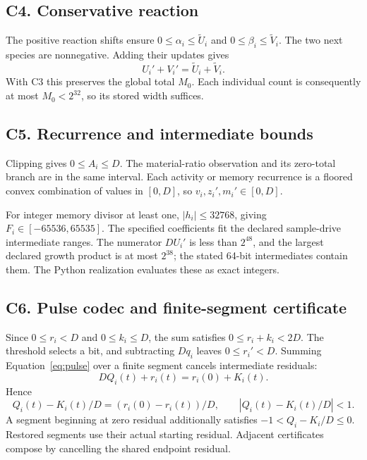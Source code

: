 \documentclass[11pt,a4paper]{article}
\numberwithin{equation}{section}
\begin{document}
\subsection*{C4. Conservative reaction}
The positive reaction shifts ensure $0\le\alpha_i\le\widetilde U_i$ and $0\le\beta_i\le\widetilde V_i$. The two next species are nonnegative. Adding their updates gives
\begin{equation}
U_i'+V_i'=\widetilde U_i+\widetilde V_i.
\end{equation}
With C3 this preserves the global total $M_0$. Each individual count is consequently at most $M_0<2^{32}$, so its stored width suffices.

\subsection*{C5. Recurrence and intermediate bounds}
Clipping gives $0\le A_i\le D$. The material-ratio observation and its zero-total branch are in the same interval. Each activity or memory recurrence is a floored convex combination of values in $[0,D]$, so $v_i,z_i',m_i'\in[0,D]$.

For integer memory divisor at least one, $|h_i|\le32768$, giving $F_i\in[-65536,65535]$. The specified coefficients fit the declared sample-drive intermediate ranges. The numerator $DU_i'$ is less than $2^{48}$, and the largest declared growth product is at most $2^{38}$; the stated 64-bit intermediates contain them. The Python realization evaluates these as exact integers.

\subsection*{C6. Pulse codec and finite-segment certificate}
Since $0\le r_i<D$ and $0\le k_i\le D$, the sum satisfies $0\le r_i+k_i<2D$. The threshold selects a bit, and subtracting $Dq_i$ leaves $0\le r_i'<D$. Summing Equation~\eqref{eq:pulse} over a finite segment cancels intermediate residuals:
\begin{equation}
DQ_i(t)+r_i(t)=r_i(0)+K_i(t).
\end{equation}
Hence
\begin{equation}
Q_i(t)-K_i(t)/D=(r_i(0)-r_i(t))/D,
\qquad |Q_i(t)-K_i(t)/D|<1.
\end{equation}
A segment beginning at zero residual additionally satisfies $-1<Q_i-K_i/D\le0$. Restored segments use their actual starting residual. Adjacent certificates compose by cancelling the shared endpoint residual.
\end{document}
